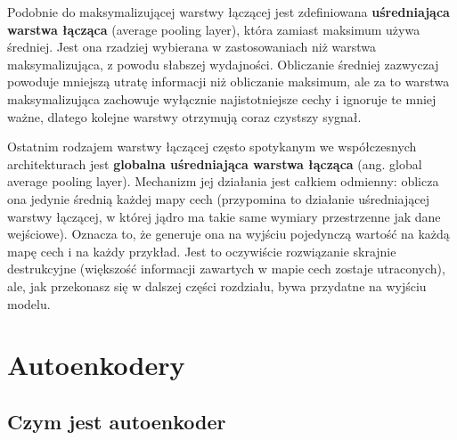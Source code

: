 \documentclass[12pt]{mwbk}
\theoremstyle{plain}
\theoremstyle{definition}
\theoremstyle{remark}
\begin{document}
Podobnie do maksymalizującej warstwy łączącej jest zdefiniowana \textbf{uśredniająca warstwa łącząca} (average pooling layer), która zamiast maksimum używa średniej. Jest ona rzadziej wybierana w zastosowaniach niż warstwa maksymalizująca, z powodu słabszej wydajności. Obliczanie średniej zazwyczaj powoduje mniejszą utratę informacji niż obliczanie maksimum, ale za to warstwa maksymalizująca zachowuje wyłącznie najistotniejsze cechy i ignoruje te mniej ważne, dlatego kolejne warstwy otrzymują coraz czystszy sygnał.

Ostatnim rodzajem warstwy łączącej często spotykanym we współczesnych architekturach jest
\textbf{globalna uśredniająca warstwa łącząca} (ang. global average pooling layer). Mechanizm jej działania
jest całkiem odmienny: oblicza ona jedynie średnią każdej mapy cech (przypomina to działanie
uśredniającej warstwy łączącej, w której jądro ma takie same wymiary przestrzenne jak dane
wejściowe). Oznacza to, że generuje ona na wyjściu pojedynczą wartość na każdą mapę cech
i na każdy przykład. Jest to oczywiście rozwiązanie skrajnie destrukcyjne (większość informacji
zawartych w mapie cech zostaje utraconych), ale, jak przekonasz się w dalszej części rozdziału,
bywa przydatne na wyjściu modelu.


	
\section{Autoenkodery}
	
\subsection{Czym jest autoenkoder}
\end{document}
